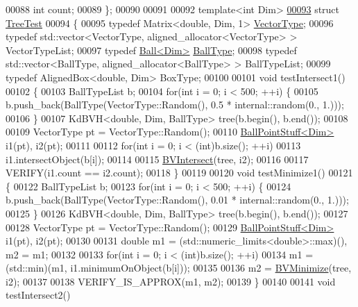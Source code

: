 \begin{DoxyCode}
00088   \textcolor{keywordtype}{int} count;
00089 \};
00090 
00091 
00092 \textcolor{keyword}{template}<\textcolor{keywordtype}{int} Dim>
\hyperlink{struct_tree_test}{00093} \textcolor{keyword}{struct }\hyperlink{struct_tree_test}{TreeTest}
00094 \{
00095   \textcolor{keyword}{typedef} Matrix<double, Dim, 1> \hyperlink{struct_vector_type}{VectorType};
00096   \textcolor{keyword}{typedef} std::vector<VectorType, aligned\_allocator<VectorType> > VectorTypeList;
00097   \textcolor{keyword}{typedef} \hyperlink{struct_ball}{Ball<Dim>} \hyperlink{struct_ball}{BallType};
00098   \textcolor{keyword}{typedef} std::vector<BallType, aligned\_allocator<BallType> > BallTypeList;
00099   \textcolor{keyword}{typedef} AlignedBox<double, Dim> BoxType;
00100 
00101   \textcolor{keywordtype}{void} testIntersect1()
00102   \{
00103     BallTypeList b;
00104     \textcolor{keywordflow}{for}(\textcolor{keywordtype}{int} i = 0; i < 500; ++i) \{
00105         b.push\_back(BallType(VectorType::Random(), 0.5 * internal::random(0., 1.)));
00106     \}
00107     KdBVH<double, Dim, BallType> tree(b.begin(), b.end());
00108 
00109     VectorType pt = VectorType::Random();
00110     \hyperlink{struct_ball_point_stuff}{BallPointStuff<Dim>} i1(pt), i2(pt);
00111 
00112     \textcolor{keywordflow}{for}(\textcolor{keywordtype}{int} i = 0; i < (int)b.size(); ++i)
00113       i1.intersectObject(b[i]);
00114 
00115     \hyperlink{namespace_eigen_a07d8e283f082c972338f3fc4f644b2a9}{BVIntersect}(tree, i2);
00116 
00117     VERIFY(i1.count == i2.count);
00118   \}
00119 
00120   \textcolor{keywordtype}{void} testMinimize1()
00121   \{
00122     BallTypeList b;
00123     \textcolor{keywordflow}{for}(\textcolor{keywordtype}{int} i = 0; i < 500; ++i) \{
00124         b.push\_back(BallType(VectorType::Random(), 0.01 * internal::random(0., 1.)));
00125     \}
00126     KdBVH<double, Dim, BallType> tree(b.begin(), b.end());
00127 
00128     VectorType pt = VectorType::Random();
00129     \hyperlink{struct_ball_point_stuff}{BallPointStuff<Dim>} i1(pt), i2(pt);
00130 
00131     \textcolor{keywordtype}{double} m1 = (std::numeric\_limits<double>::max)(), m2 = m1;
00132 
00133     \textcolor{keywordflow}{for}(\textcolor{keywordtype}{int} i = 0; i < (int)b.size(); ++i)
00134       m1 = (std::min)(m1, i1.minimumOnObject(b[i]));
00135 
00136     m2 = \hyperlink{namespace_eigen_adcbe73ac1482eacab0e18ee32c25508e}{BVMinimize}(tree, i2);
00137 
00138     VERIFY\_IS\_APPROX(m1, m2);
00139   \}
00140 
00141   \textcolor{keywordtype}{void} testIntersect2()

\end{DoxyCode}
